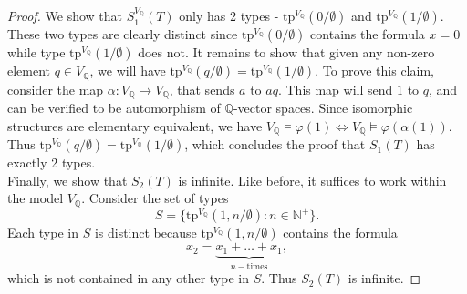 \documentclass{article}
\begin{document}
\begin{enumerate}[label={\bf Q\arabic*:}]
\begin{proof}
      We show that $S_1^{V_{\mathbb{Q}}}(T)$ only has 2 types -
      $\text{tp}^{V_{\mathbb{Q}}}(0/\emptyset)$ and
      $\text{tp}^{V_{\mathbb{Q}}}(1/\emptyset)$. These two types are
      clearly distinct since $\text{tp}^{V_{\mathbb{Q}}}(0/\emptyset)$
      contains the formula $x=0$ while type
      $\text{tp}^{V_{\mathbb{Q}}}(1/\emptyset)$ does not. It remains to
      show that given any non-zero element $q\in V_\mathbb{Q}$, we will
      have $\text{tp}^{V_{\mathbb{Q}}}(q/\emptyset)=
      \text{tp}^{V_{\mathbb{Q}}}(1/\emptyset)$. To prove this claim,
      consider the map $\alpha:V_{\mathbb{Q}}\rightarrow V_{\mathbb{Q}}$,
      that sends $a$ to $aq$. This map will send $1$ to $q$, and can be
      verified to be automorphism of $\mathbb{Q}$-vector spaces. Since
      isomorphic structures are elementary equivalent, we have
      $V_\mathbb{Q}\models\varphi(1)\Leftrightarrow
      V_\mathbb{Q}\models\varphi(\alpha(1))$. Thus
      $\text{tp}^{V_{\mathbb{Q}}}(q/\emptyset)=
      \text{tp}^{V_{\mathbb{Q}}}(1/\emptyset)$, which concludes the proof
      that $S_1(T)$ has exactly 2 types. \\

      Finally, we show that $S_2(T)$ is infinite. Like before, it suffices
      to work within the model $V_\mathbb{Q}$. Consider the set of types
      \[S=\{\text{tp}^{V_\mathbb{Q}}(1,n/\emptyset): n\in\mathbb{N}^+\}.\]
      Each type in $S$ is distinct because
      $\text{tp}^{V_\mathbb{Q}}(1,n/\emptyset)$ contains the formula
      \[x_2=\underbrace{x_1+\ldots+x_1}_{n-\text{times}},\] which is not
      contained in any other type in $S$. Thus $S_2(T)$ is infinite.
    \end{proof}
\end{enumerate}
\end{document}
